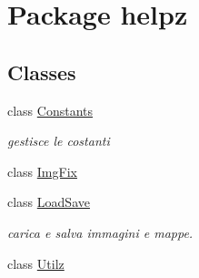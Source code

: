 \hypertarget{namespacehelpz}{}\section{Package helpz}
\label{namespacehelpz}
\subsection*{Classes}
\begin{DoxyCompactItemize}
\item 
class \hyperlink{classhelpz_1_1_constants}{Constants}
\begin{DoxyCompactList}\small\item\em gestisce le costanti \end{DoxyCompactList}\item 
class \hyperlink{classhelpz_1_1_img_fix}{Img\+Fix}
\item 
class \hyperlink{classhelpz_1_1_load_save}{Load\+Save}
\begin{DoxyCompactList}\small\item\em carica e salva immagini e mappe. \end{DoxyCompactList}\item 
class \hyperlink{classhelpz_1_1_utilz}{Utilz}
\end{DoxyCompactItemize}

